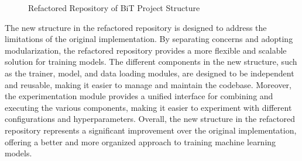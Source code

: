 \begin{figure}[h]
\centering
{}\caption{Refactored Repository of BiT Project Structure}
\end{figure}


The new structure in the refactored repository is designed to address the limitations of the original implementation. By separating concerns and adopting modularization, the refactored repository provides a more flexible and scalable solution for training models. The different components in the new structure, such as the trainer, model, and data loading modules, are designed to be independent and reusable, making it easier to manage and maintain the codebase. Moreover, the experimentation module provides a unified interface for combining and executing the various components, making it easier to experiment with different configurations and hyperparameters. Overall, the new structure in the refactored repository represents a significant improvement over the original implementation, offering a better and more organized approach to training machine learning models.




